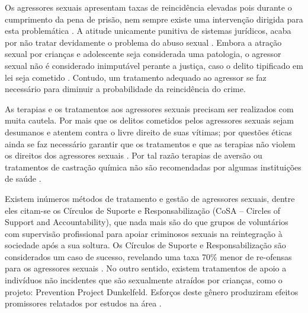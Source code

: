 
Os agressores sexuais apresentam taxas de reincidência elevadas pois durante o cumprimento da pena de prisão, nem sempre existe uma intervenção dirigida para esta problemática \cite{ribeiro2018programas, finkelhor2009prevention, maia2014castraccao}. A atitude unicamente punitiva de sistemas jurídicos, acaba por não tratar devidamente o problema do abuso sexual \cite{Camila2019}. Embora a atração sexual por crianças e adolescente seja considerada uma patologia, o agressor sexual não é considerado inimputável perante a justiça, caso o delito tipificado em lei seja cometido \cite{ribeiro2018programas}. Contudo, um tratamento adequado ao agressor se faz necessário para diminuir a probabilidade da reincidência do crime. 

As terapias e os tratamentos aos agressores sexuais precisam ser realizados com muita cautela. Por mais que os delitos cometidos pelos agressores sexuais sejam desumanos e atentem contra o livre direito de suas vítimas; por questões éticas ainda se faz necessário garantir que os tratamentos e que as terapias não violem os direitos dos agressores sexuais \cite{finkelhor2009prevention}. Por tal razão terapias de aversão ou tratamentos de castração química não são recomendadas por algumas instituições de saúde \cite{maia2014castraccao}.




Existem inúmeros métodos de tratamento e gestão de agressores sexuais, dentre eles citam-se os Círculos de Suporte e Responsabilização (CoSA – Circles of Support and Accountability), que nada mais são do que grupos de voluntários com supervisão profissional para apoiar criminosos sexuais na reintegração à sociedade após a sua soltura. Os Círculos de Suporte e Responsabilização são considerados um caso de sucesso, revelando uma taxa 70\% menor de re-ofensas para os agressores sexuais \cite{finkelhor2009prevention}. No outro sentido, existem tratamentos de apoio a indivíduos não incidentes que são sexualmente atraídos por crianças, como o projeto: Prevention Project Dunkelfeld. Esforços deste gênero produziram efeitos promissores relatados por estudos na área \cite{mendelson2015parent}.


